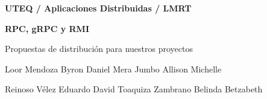 \begin{frame}[plain]\relax
\centering
{\small\bfseries\color{Azul} UTEQ \enspace / \enspace Aplicaciones Distribuidas \enspace / \enspace LMRT\par}
\vspace{8mm}
{\fontsize{32}{36}\selectfont\bfseries RPC, gRPC y RMI\par}
\medskip
{\large Propuestas de distribución para nuestros proyectos\par}
\vspace{8mm}
{\small Loor Mendoza Byron Daniel \quad Mera Jumbo Allison Michelle\par
Reinoso Vélez Eduardo David \quad Toaquiza Zambrano Belinda Betzabeth\par}
\end{frame}
